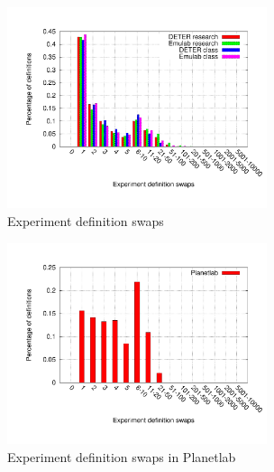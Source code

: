 \begin{figure}[htbp] \begin{center} \includegraphics[width=3in,
type=pdf,ext=.pdf,read=.pdf]{figs/exp.swaps.gnu} \caption{Experiment
definition swaps} \label{expswaps} \end{center} \end{figure}

\begin{figure}[htbp] \begin{center} \includegraphics[width=3in,
type=pdf,ext=.pdf,read=.pdf]{figs/planet.swaps.gnu} \caption{Experiment
definition swaps in Planetlab} \label{expswaps} \end{center}
\end{figure}

